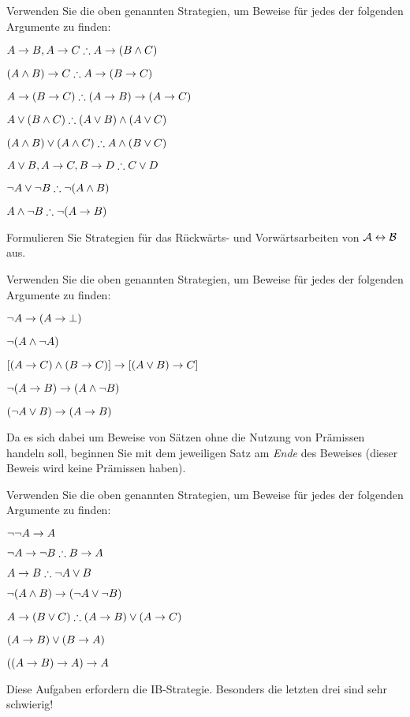 \practiceproblems

\problempart
Verwenden Sie die oben genannten Strategien, um Beweise für jedes der folgenden Argumente zu finden:
\begin{earg}
\item $A \eif B, A \eif C \therefore A \eif (B \eand C)$
\item $(A \eand B) \eif C \therefore A \eif (B \eif C)$
\item $A \eif (B \eif C) \therefore (A \eif B) \eif (A \eif C)$
\item $A \eor (B \eand C) \therefore (A \eor B) \eand (A \eor C)$
\item $(A \eand B) \eor (A \eand C) \therefore A \eand (B \eor C)$
\item $A \eor B, A \eif C, B \eif D \therefore C \eor D$
\item $\enot A \lor \enot B \therefore \enot(A \eand B)$
\item $A \eand \enot B \therefore \enot(A \eif B)$
\end{earg}

\problempart
Formulieren Sie Strategien für das Rückwärts- und Vorwärtsarbeiten von $\mathcal{A} \leftrightarrow \mathcal{B}$ aus.


\problempart
Verwenden Sie die oben genannten Strategien, um Beweise für jedes der folgenden Argumente zu finden:
\begin{earg}
\item $\neg A \rightarrow (A \rightarrow \bot)$
\item $\neg(A \wedge \neg A)$
\item $[(A \rightarrow C) \wedge (B \rightarrow C)] \rightarrow [(A \lor B) \rightarrow C]$
\item $\neg(A \rightarrow B) \rightarrow (A \wedge \neg B)$
\item $(\neg A \vee B) \rightarrow (A \rightarrow B)$
\end{earg}
Da es sich dabei um Beweise von Sätzen ohne die Nutzung von Prämissen handeln soll, beginnen Sie mit dem jeweiligen Satz am \emph{Ende} des Beweises (dieser Beweis wird keine Prämissen haben).

\problempart
Verwenden Sie die oben genannten Strategien, um Beweise für jedes der folgenden Argumente zu finden:
\begin{earg}
\item $\neg\neg A \rightarrow A$
\item $\enot A \eif \enot B \therefore B \eif A$
\item $A \eif B \therefore \enot A \eor B$
\item $\neg(A \wedge B) \rightarrow (\neg A \vee \neg B)$
\item $A \eif (B \eor C) \therefore (A \eif B) \eor (A \eif C)$
\item $(A \rightarrow B) \lor (B \rightarrow A)$
\item $((A \rightarrow B) \rightarrow A) \rightarrow A$
\end{earg}
Diese Aufgaben erfordern die IB-Strategie. Besonders die letzten drei sind sehr schwierig!

